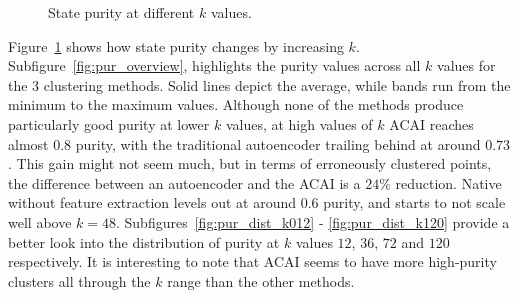 \begin{figure}
{					\label{fig:pur_dist_k072}
				}
				\caption[State purities in the renewed EMA evaluation]{State purity at different $k$ values.}
				\label{fig:pur_dist}
			\end{figure}
			
			Figure~\ref{fig:pur_dist} shows how state purity changes by increasing $k$.
			Subfigure~\ref{fig:pur_overview}, highlights the purity values across all $k$ values for the $3$ clustering methods. 
			Solid lines depict the average, while bands run from the minimum to the maximum values.
			Although none of the methods produce particularly good purity at lower $k$ values, at high values of $k$ \ac{ACAI} reaches almost $0.8$ purity, with the traditional autoencoder trailing behind at around $0.73$. 
			This gain might not seem much, but in terms of erroneously clustered points, the difference between an autoencoder and the \ac{ACAI} is a $24\%$ reduction. 
			Native \kmeans{} without feature extraction levels out at around $0.6$ purity, and starts to not scale well above $k=48$.	
			Subfigures~\ref{fig:pur_dist_k012} - \ref{fig:pur_dist_k120} provide a better look into the distribution of purity at $k$ values $12$, $36$, $72$ and $120$ respectively.
			It is interesting to note that \ac{ACAI} seems to have more high-purity clusters all through the $k$ range than the other methods.
			
